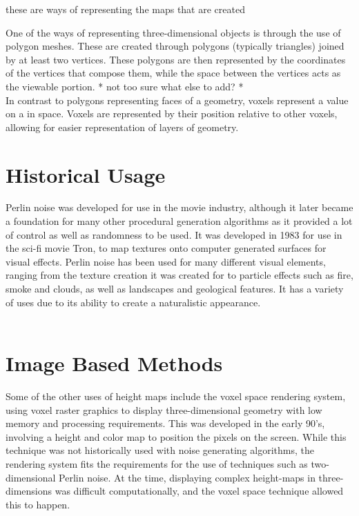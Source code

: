 \documentclass[12pt]{report}
\begin{document}
		these are ways of representing the maps that are created
		
		One of the ways of representing three-dimensional objects is through the use of polygon meshes. These are created through polygons (typically triangles) joined by at least two vertices. These polygons are then represented by the coordinates of the vertices that compose them, while the space between the vertices acts as the viewable portion. 
		* not too sure what else to add? * \\ 
		
		In contrast to polygons representing faces of a geometry, voxels represent a value on a in space. Voxels are represented by their position relative to other voxels, allowing for easier representation of layers of geometry. \\
	
	\let\clearpage\relax
	\chapter{Historical Usage} %
		
		Perlin noise was developed for use in the movie industry, although it later became a foundation for many other procedural generation algorithms as it provided a lot of control as well as randomness to be used. It was developed in 1983 for use in the sci-fi movie Tron, to map textures onto computer generated surfaces for visual effects. Perlin noise has been used for many different visual elements, ranging from the texture creation it was created for to particle effects such as fire, smoke and clouds, as well as landscapes and geological features. It has a variety of uses due to its ability to create a naturalistic appearance. \\
		\\
		
		
		
		
		
	\chapter{Image Based Methods}
	
		\noindent Some of the other uses of height maps include the voxel space rendering system, using voxel raster graphics to display three-dimensional geometry with low memory and processing requirements. This was developed in the early 90's, involving a height and color map to position the pixels on the screen. While this technique was not historically used with noise generating algorithms, the rendering system fits the requirements for the use of techniques such as two-dimensional Perlin noise. At the time, displaying complex height-maps in three-dimensions was difficult computationally, and the voxel space technique allowed this to happen. 
		
\end{document}
